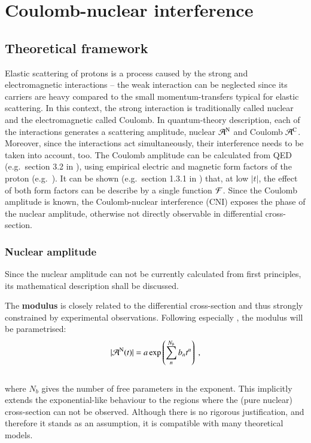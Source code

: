 \section{Coulomb-nuclear interference}


\subsection{Theoretical framework}
\label{sec:cni_framework}

Elastic scattering of protons is a process caused by the strong and electromagnetic interactions -- the weak interaction can be neglected since its carriers are heavy compared to the small momentum-transfers typical for elastic scattering. In this context, the strong interaction is traditionally called nuclear and the electromagnetic called Coulomb. In quantum-theory description, each of the interactions generates a scattering amplitude, nuclear ${\cal A}^{\rm N}$ and Coulomb ${\cal A}^{\rm C}$. Moreover, since the interactions act simultaneously, their interference needs to be taken into account, too. The Coulomb amplitude can be calculated from QED (e.g.~section 3.2 in \cite{block06}), using empirical electric and magnetic form factors of the proton (e.g.~\cite{puckett10}). It can be shown (e.g.~section 1.3.1 in \cite{jan_thesis}) that, at low $|t|$, the effect of both form factors can be describe by a single function ${\cal F}$. Since the Coulomb amplitude is known, the Coulomb-nuclear interference (CNI) exposes the phase of the nuclear amplitude, otherwise not directly observable in differential cross-section.  


\subsubsection{Nuclear amplitude}

Since the nuclear amplitude can not be currently calculated from first principles, its mathematical description shall be discussed.

The {\bf modulus} is closely related to the differential cross-section and thus strongly constrained by experimental observations. Following especially \cite{8tev-90m}, the modulus will be parametrised:
\begin{equation}
\label{eq:nuc mod}
| {\cal A}^{\rm N}(t) | = a \exp\left( \sum\limits_{n}^{N_b} b_n t^n \right)\ ,
\end{equation}
\\
where $N_b$ gives the number of free parameters in the exponent. This implicitly extends the exponential-like behaviour to the regions where the (pure nuclear) cross-section can not be observed. Although there is no rigorous justification, and therefore it stands as an assumption, it is compatible with many theoretical models.

